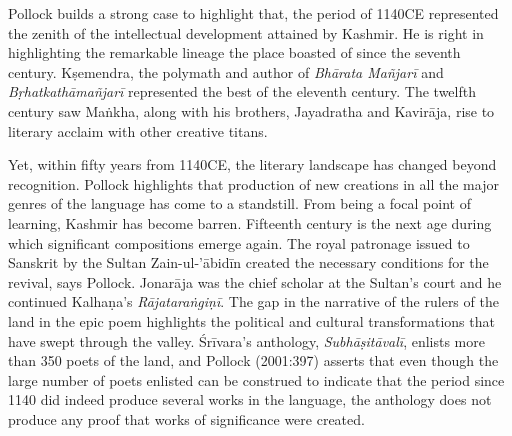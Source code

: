 Pollock builds a strong case to highlight that, the period of 1140CE represented the zenith of the intellectual development attained by Kashmir. He is right in highlighting the remarkable lineage the place boasted of since the seventh century. Kṣemendra, the polymath and author of {\sl Bhārata Mañjarī} and {\sl Bṛhatkathāmañjarī} represented the best of the eleventh century. The twelfth century saw Maṅkha, along with his brothers, Jayadratha and Kavirāja, rise to literary acclaim with other creative titans.

Yet, within fifty years from 1140CE, the literary landscape has changed beyond recognition. Pollock highlights that production of new creations in all the major genres of the language has come to a standstill. From being a focal point of learning, Kashmir has become barren. Fifteenth century is the next age during which significant compositions emerge again. The royal patronage issued to Sanskrit by the Sultan Zain-ul-’ābidīn created the necessary conditions for the revival, says Pollock. Jonarāja was the chief scholar at the Sultan’s court and he continued Kalhaṇa’s {\sl Rājataraṅgiṇī}. The gap in the narrative of the rulers of the land in the epic poem highlights the political and cultural transformations that have swept through the valley. Śrīvara’s anthology, {\sl Subhāṣitāvalī}, enlists more than 350 poets of the land, and Pollock (2001:397) asserts that even though the large number of poets enlisted can be construed to indicate that the period since 1140 did indeed produce several works in the language, the anthology does not produce any proof that works of significance were created.

